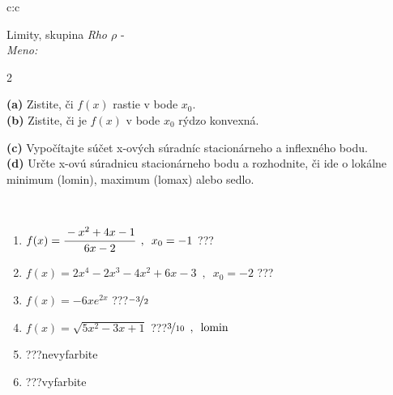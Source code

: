 \documentclass[10pt]{report}
\begin{document}
\begin{tabular}{c:c}
\begin{minipage}[c][104.5mm][t]{0.5\linewidth}
\begin{center}
\vspace{7mm}
{\huge Limity, skupina \textit{Rho $\rho$} -}\\[5mm]
\textit{Meno:}\phantom{xxxxxxxxxxxxxxxxxxxxxxxxxxxxxxxxxxxxxxxxxxxxxxxxxxxxxxxxxxxxxxxxx}\\[5mm]
\begin{minipage}{0.95\linewidth}
\begin{center}
{\small \begin{multicols}{2} \raggedright
\textbf{(a)} Zistite, či \(f(x)\) rastie v bode \(x_0\). \\[1mm]
\textbf{(b)} Zistite, či je \(f(x)\) v bode \(x_0\) rýdzo konvexná. \par \columnbreak
\textbf{(c)} Vypočítajte súčet x-ových súradníc stacionárneho a inflexného bodu. \\[1mm]
\textbf{(d)} Určte x-ovú súradnicu stacionárneho bodu a rozhodnite, či ide o lokálne minimum (lomin), maximum (lomax) alebo sedlo. \\[1mm]
\end{multicols}
}
\end{center}
\end{minipage}
\\[4mm]
\begin{minipage}{0.79\linewidth}
\begin{center}
\begin{varwidth}{\linewidth}
\begin{enumerate}
\normalsize
\item $f(x)=\cfrac{-x^2+4x-1}{6x-2}\enspace , \enspace x_0=-1$\quad \dotfill\; ???\;\dotfill \quad {}
\item $f(x)=2x^4-2x^3-4x^2+6x-3\enspace , \enspace x_0=-2$\quad \dotfill\; ???\;\dotfill \quad {}
\item $f(x)=-6xe^{2x}$\quad \dotfill\; ???\;\dotfill \quad $\nicefrac{-3}{2}$
\item $f(x)=\sqrt{5x^2-3x+1}$\quad \dotfill\; ???\;\dotfill \quad $\nicefrac{3}{10}\enspace , \enspace\text{lomin}$
\item \quad \dotfill\; ???\;\dotfill \quad nevyfarbite
\item \quad \dotfill\; ???\;\dotfill \quad vyfarbite
\end{enumerate}
\end{varwidth}
\end{center}

\end{minipage}
\end{center}
\end{minipage}
\end{tabular}
\end{document}
